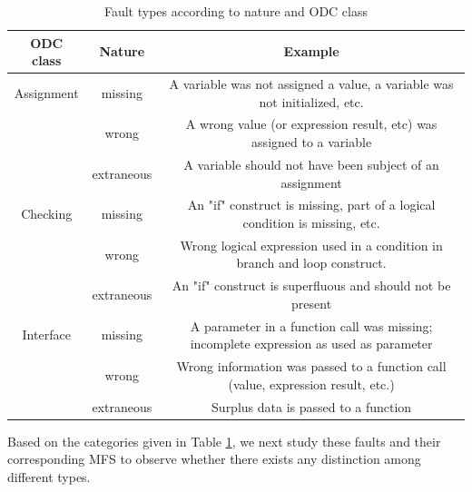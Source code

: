 \documentclass{sig-alternate-05-2015}
\begin{document}
\begin{table}[!ht]
  \centering
  \caption{Fault types according to nature and ODC class}
    \begin{tabular}{|c|c|c|}  \hline
    ODC class & Nature & Example \\ \hline
    Assignment & missing & A variable was not assigned a value, a variable was not initialized, etc. \\
          & wrong & A wrong value (or expression result, etc) was assigned to a variable \\
          & extraneous & A variable should not have been subject of an assignment \\  \hline
    Checking & missing & An "if" construct is missing, part of a logical condition is missing, etc. \\
          & wrong & Wrong logical expression used in a condition in branch and loop construct. \\
          & extraneous & An "if" construct is superfluous and should not be present \\  \hline
    Interface & missing & A parameter in a function call was missing; incomplete expression as used as parameter \\
          & wrong & Wrong information was passed to a function call (value, expression result, etc.) \\
          & extraneous & Surplus data is passed to a function \\  \hline
    \end{tabular}%
  \label{tab_fault typles}%
\end{table}%

Based on the categories given in Table \ref{tab_fault typles}, we next study these faults and their corresponding MFS to observe whether there exists any distinction among different types.
\end{document}
